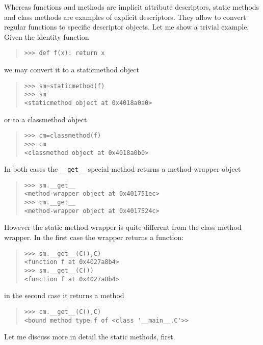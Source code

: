 \documentclass[10pt,english]{article}
\begin{document}
Whereas functions and methods are implicit attribute descriptors,
static methods and class methods are examples of explicit
descriptors. They allow to convert regular functions to 
specific descriptor objects. Let me show a trivial example. 
Given the identity function
\begin{quote}
\begin{verbatim}>>> def f(x): return x\end{verbatim}
\end{quote}

we may convert it to a staticmethod object
\begin{quote}
\begin{verbatim}>>> sm=staticmethod(f)
>>> sm
<staticmethod object at 0x4018a0a0>\end{verbatim}
\end{quote}

or to a classmethod object
\begin{quote}
\begin{verbatim}>>> cm=classmethod(f)
>>> cm
<classmethod object at 0x4018a0b0>\end{verbatim}
\end{quote}

In both cases the \texttt{{\_}{\_}get{\_}{\_}} special method returns a method-wrapper object
\begin{quote}
\begin{verbatim}>>> sm.__get__
<method-wrapper object at 0x401751ec>
>>> cm.__get__
<method-wrapper object at 0x4017524c>\end{verbatim}
\end{quote}

However the static method wrapper is quite different from the class
method wrapper. In the first case the wrapper returns a function:
\begin{quote}
\begin{verbatim}>>> sm.__get__(C(),C)
<function f at 0x4027a8b4>
>>> sm.__get__(C())
<function f at 0x4027a8b4>\end{verbatim}
\end{quote}

in the second case it returns a method
\begin{quote}
\begin{verbatim}>>> cm.__get__(C(),C)
<bound method type.f of <class '__main__.C'>>\end{verbatim}
\end{quote}

Let me discuss more in detail the static methods, first.
\end{document}

